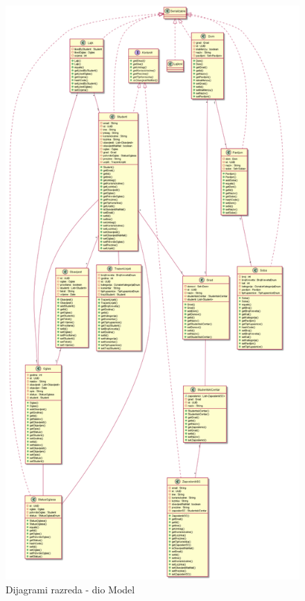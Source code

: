 			\begin{figure}[H]
				\includegraphics[scale=0.35]{dijagrami/model.png} %
				\centering
				\caption{Dijagrami razreda - dio Model}
				\label{fig:model}
			\end{figure}
		
